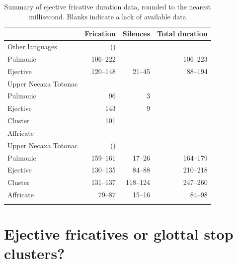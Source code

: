 \documentclass[output=paper,colorlinks,citecolor=brown]{langscibook}
\begin{document}
\begin{table}
    \caption{Summary of ejective fricative duration data, rounded to the nearest millisecond. Blanks indicate a lack of available data}
    \label{tab:resultssummary}
    \begin{tabularx}{0.9\textwidth}{lrrr}
		\lsptoprule
		& Frication & Silences & Total duration\\
		\midrule
		{Other languages} & (\sectref{section:FricDur})&&\\
		Pulmonic & 106--222  & & 106--223  \\
            Ejective & 120--148  & 21--45  & 88--194  \\
		\midrule
		{Upper Necaxa Totonac} & \citep{Beck2006}&& \\
		Pulmonic & 96  & 3  & \\
		Ejective & 143  & 9  & \\
		Cluster & 101  &  & \\
		Affricate &  &  &  \\
		\midrule
		{Upper Necaxa Totonac} & (\sectref{section:results})&& \\
		Pulmonic & 159--161  & 17--26  & 164--179 \\
		Ejective & 130--135  & 84--88  & 210--218 \\
		Cluster & 131--137  & 118--124  & 247--260  \\
		Affricate & 79--87  & 15--16  & 84--98 \\
        \lspbottomrule
    \end{tabularx}
\end{table}

\section{Ejective fricatives or glottal stop clusters?}\label{section:discussion}
\end{document}
